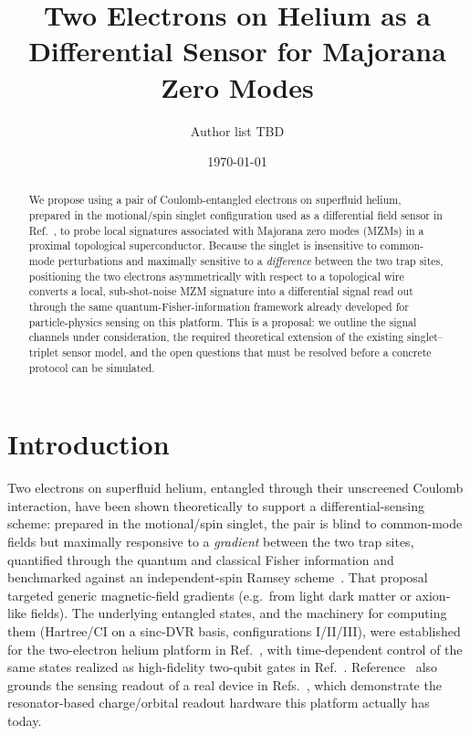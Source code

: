 \documentclass[aps,pra,reprint,superscriptaddress,longbibliography]{revtex4-2}
\begin{document}
\title{Two Electrons on Helium as a Differential Sensor for Majorana Zero Modes}

\author{Author list TBD}

\date{\today}

\begin{abstract}
We propose using a pair of Coulomb-entangled electrons on superfluid helium, prepared in the
motional/spin singlet configuration used as a differential field sensor in
Ref.~\cite{perruzza2026}, to probe local signatures associated with Majorana zero modes (MZMs) in
a proximal topological superconductor. Because the singlet is insensitive to common-mode
perturbations and maximally sensitive to a \emph{difference} between the two trap sites, positioning
the two electrons asymmetrically with respect to a topological wire converts a local,
sub-shot-noise MZM signature into a differential signal read out through the same
quantum-Fisher-information framework already developed for particle-physics sensing on this
platform. This is a proposal: we outline the signal channels under consideration, the required
theoretical extension of the existing singlet--triplet sensor model, and the open questions that
must be resolved before a concrete protocol can be simulated.
\end{abstract}

\maketitle

\section{Introduction}

Two electrons on superfluid helium, entangled through their unscreened Coulomb interaction, have
been shown theoretically to support a differential-sensing scheme: prepared in the motional/spin
singlet, the pair is blind to common-mode fields but maximally responsive to a \emph{gradient}
between the two trap sites, quantified through the quantum and classical Fisher information and
benchmarked against an independent-spin Ramsey scheme~\cite{perruzza2026}. That proposal targeted
generic magnetic-field gradients (e.g.\ from light dark matter or axion-like fields). The
underlying entangled states, and the machinery for computing them (Hartree/CI on a sinc-DVR basis,
configurations I/II/III), were established for the two-electron helium platform in
Ref.~\cite{beysengulov2024}, with time-dependent control of the same states realized as high-fidelity
two-qubit gates in Ref.~\cite{leinonen2025}. Reference~\cite{perruzza2026} also grounds the sensing
readout of a real device in Refs.~\cite{koolstra2025impedance,castoria2025}, which demonstrate the
resonator-based charge/orbital readout hardware this platform actually has today.
\end{document}
